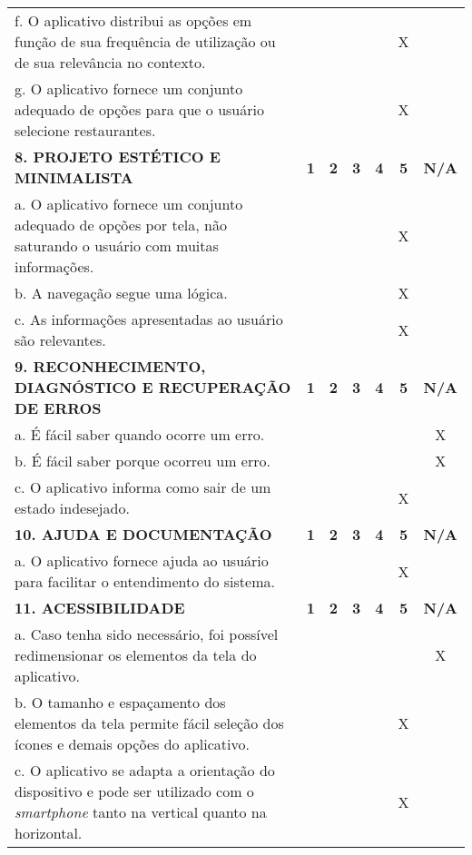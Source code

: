 \documentclass[portuguese,oneside]{tcc}
\begin{document}
\begin{table}[h]
{\begin{tabu}{|L{25em}|c|c|c|c|c|c|}
							f. O aplicativo distribui as opções em função de sua frequência de utilização ou de sua relevância no contexto.	& & & & & X & \\ 
							g. O aplicativo fornece um conjunto adequado de opções para que o usuário selecione restaurantes. & & & & & X & \\ 
							\textbf{8. PROJETO ESTÉTICO E MINIMALISTA} & \textbf{1} & \textbf{2} & \textbf{3} & \textbf{4} & \textbf{5} & \textbf{N/A} \\ 
							a. O aplicativo fornece um conjunto adequado de opções por tela, não saturando o usuário com muitas informações. & & & & & X & \\ 
							b. A navegação segue uma lógica. & & & & & X & \\ 
							c. As informações apresentadas ao usuário são relevantes. & & & & & X & \\ 
							\textbf{9. RECONHECIMENTO, DIAGNÓSTICO E RECUPERAÇÃO DE ERROS} & \textbf{1} & \textbf{2} & \textbf{3} & \textbf{4} & \textbf{5} & \textbf{N/A} \\ 
							a. É fácil saber quando ocorre um erro.	& & & & & & X \\ 
							b. É fácil saber porque ocorreu um erro. & & & & & & X \\ 
							c. O aplicativo informa como sair de um estado indesejado. & & & & & X & \\ 
							\textbf{10. AJUDA E DOCUMENTAÇÃO} & \textbf{1} & \textbf{2} & \textbf{3} & \textbf{4} & \textbf{5} & \textbf{N/A} \\ 
							a. O aplicativo fornece ajuda ao usuário para facilitar o entendimento do sistema. & & & & & X & \\ 
							\textbf{11. ACESSIBILIDADE} & \textbf{1} & \textbf{2} & \textbf{3} & \textbf{4} & \textbf{5} & \textbf{N/A} \\ 
							a. Caso tenha sido necessário, foi possível redimensionar os elementos da tela do aplicativo. & & & & & & X \\ 
							b. O tamanho e espaçamento dos elementos da tela permite fácil seleção dos ícones e demais opções do aplicativo. & & & & & X & \\ 
							c. O aplicativo se adapta a orientação do dispositivo e pode ser utilizado com o \emph{smartphone} tanto na vertical quanto na horizontal. & & & & & X & \\ 

\end{tabu}}
\end{table}
\end{document}
